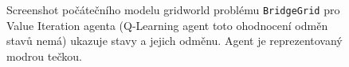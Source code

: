 \begin{figure}[!htbp]
\begin{center}
  \caption{Screenshot počátečního modelu gridworld problému \texttt{BridgeGrid} pro Value Iteration agenta (Q-Learning agent toto ohodnocení odměn stavů nemá) ukazuje stavy a jejich odměnu. Agent je reprezentovaný modrou tečkou.}
  \label{img:bridgeGridDefault}
\end{center}
\end{figure}


